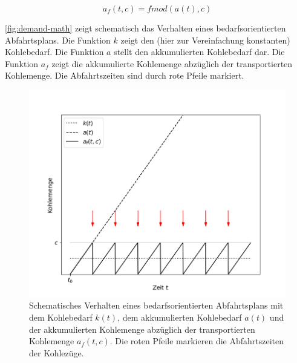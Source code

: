 \begin{equation}
    a_f(t, c)=fmod(a(t), c)\label{eq:kohle-fmod}
\end{equation}

\autoref{fig:demand-math} zeigt schematisch das Verhalten eines bedarfsorientierten Abfahrtsplans. Die Funktion $k$ zeigt den (hier zur Vereinfachung konstanten) Kohlebedarf. Die Funktion $a$ stellt den akkumulierten Kohlebedarf dar. Die Funktion $a_f$ zeigt die akkumulierte Kohlemenge abzüglich der transportierten Kohlemenge. Die Abfahrtszeiten sind durch rote Pfeile markiert.

\begin{figure}[!ht]
	\centering
	\includegraphics[width=1.0\linewidth]{images/demand-math.png}
	\caption{Schematisches Verhalten eines bedarfsorientierten Abfahrtsplans mit dem Kohlebedarf $k(t)$, dem akkumulierten Kohlebedarf $a(t)$ und der akkumulierten Kohlemenge abzüglich der transportierten Kohlemenge $a_f(t,c)$. Die roten Pfeile markieren die Abfahrtszeiten der Kohlezüge.}
	\label{fig:demand-math}
\end{figure}
